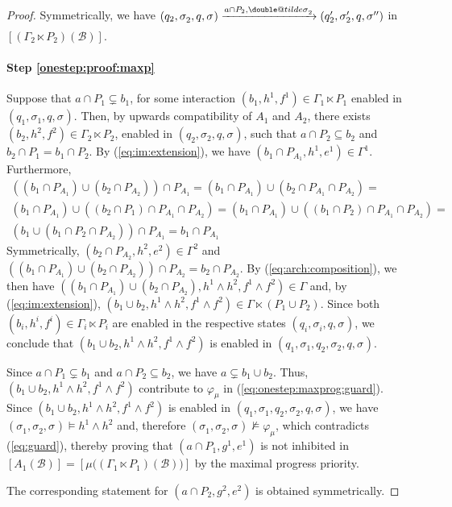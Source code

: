 \documentclass{llncs}
\makeatletter
\newcommand{\eq}[1]{(\ref{eq:#1})}
\newcommand{\cB}{\ensuremath{\mathcal{B}}}
\newcommand{\goesto}[2][]{\ensuremath{\xrightarrow[{#1}\relax]{#2}}}
\newcommand{\val}[3][]{\ensuremath{#1{\sigma}^{#2}_{#3}}}
\newcommand{\primeit}[1]{#1'}
\newcommand{\secondit}[1]{#1''}
\newcommand{\semopen}[1]{\ensuremath{[{#1}]}}
\newcommand{\IMextend}[2]{\ensuremath{#1 \ltimes #2}}
\newcommand{\expmix}{\wedge}
\newcommand{\doubletilde}[1]{{%
  \mathpalette\double@tilde{#1}%
}}
\newcommand{\double@tilde}[2]{%
  \sbox\z@{$\m@th#1\tilde{#2}$}%
  \ht\z@=.9\ht\z@
  \tilde{\box\z@}%
}
\makeatother
\begin{document}
\begin{proof}
  Symmetrically, we have 
  $
  (q_2, \val{}{2}, q, \val{}{})
  \goesto{a \cap P_2, \val[\doubletilde]{}{2}}
  (q_2', \val[\primeit]{}{2}, q, \val[\secondit]{}{})
  $ in $\semopen{(\IMextend{\Gamma_2}{P_2})(\cB)}$.   
   
  \paragraph*{Step \ref{onestep:proof:maxp}}
  Suppose that $a \cap P_1 \varsubsetneq b_1$, for some interaction
  $(b_1, h^1, f^1) \in \IMextend{\Gamma_1}{P_1}$ enabled in $(q_1,
  \val{}{1}, q, \val{}{})$.  Then, by upwards compatibility of $A_1$
  and $A_2$, there exists $(b_2, h^2, f^2) \in
  \IMextend{\Gamma_2}{P_2}$, enabled in $(q_2, \val{}{2}, q,
  \val{}{})$, such that $a \cap P_2 \subseteq b_2$ and $b_2 \cap P_1 =
  b_1 \cap P_2$.  By \eq{im:extension}, we have $(b_1 \cap P_{A_1},
  h^1, e^1) \in \Gamma^1$.  Furthermore,
%
  \begin{multline*}
    ((b_1 \cap P_{A_1}) \cup (b_2 \cap P_{A_2}))  \cap P_{A_1} =
    (b_1 \cap P_{A_1}) \cup (b_2 \cap P_{A_1} \cap P_{A_2}) =\\
    (b_1 \cap P_{A_1}) \cup ((b_2 \cap P_1) \cap P_{A_1} \cap P_{A_2}) =  
    (b_1 \cap P_{A_1}) \cup ((b_1 \cap P_2) \cap P_{A_1} \cap P_{A_2}) =\\
    (b_1 \cup (b_1 \cap P_2 \cap P_{A_2})) \cap P_{A_1} =
    b_1 \cap P_{A_1} 
  \end{multline*}
%
  Symmetrically, $(b_2 \cap P_{A_2}, h^2, e^2) \in \Gamma^2$ and
  $((b_1 \cap P_{A_1}) \cup (b_2 \cap P_{A_2})) \cap P_{A_2} = b_2
  \cap P_{A_2}$.  By \eq{arch:composition}, we then have $((b_1 \cap
  P_{A_1}) \cup (b_2 \cap P_{A_2}), h^1 \land h^2, f^1 \expmix f^2)
  \in \Gamma$ and, by \eq{im:extension}, $(b_1 \cup b_2, h^1 \land
  h^2, f^1 \expmix f^2) \in \IMextend{\Gamma}{(P_1 \cup P_2)}$.
%
  Since both $(b_i, h^i, f^i) \in \IMextend{\Gamma_i}{P_i}$ are
  enabled in the respective states $(q_i, \val{}{i}, q, \val{}{})$, we
  conclude that $(b_1 \cup b_2, h^1 \land h^2, f^1 \expmix f^2)$ is
  enabled in $(q_1, \val{}{1}, q_2, \val{}{2}, q, \val{}{})$.

  Since $a \cap P_1 \varsubsetneq b_1$ and $a \cap P_2 \subseteq b_2$,
  we have $a \varsubsetneq b_1 \cup b_2$.  Thus, $(b_1 \cup b_2, h^1
  \land h^2, f^1 \expmix f^2)$ contribute to $\varphi_\mu$ in
  \eq{onestep:maxprog:guard}.  Since $(b_1 \cup b_2, h^1 \land h^2,
  f^1 \expmix f^2)$ is enabled in $(q_1, \val{}{1}, q_2, \val{}{2}, q,
  \val{}{})$, we have $(\val{}{1}, \val{}{2}, \val{}{}) \models h^1
  \land h^2$ and, therefore $(\val{}{1}, \val{}{2}, \val{}{})
  \not\models \varphi_\mu$, which contradicts \eq{guard}, thereby
  proving that $(a \cap P_1, g^1, e^1)$ is not inhibited in
  $\semopen{A_1(\cB)} =
  \semopen{\mu\bigl((\IMextend{\Gamma_1}{P_1})(\cB)\bigr)}$ by the
  maximal progress priority.

  The corresponding statement for $(a \cap P_2, g^2, e^2)$ is obtained
  symmetrically.
\end{proof}
\end{document}
